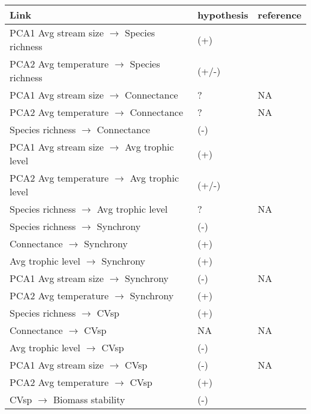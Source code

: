 \begin{tabular}{| m{7cm}| m{2cm}| m{4cm}|}
    \hline
    Link & hypothesis & reference\\
    \hline
    PCA1 Avg stream size $\to$ Species richness & (+) &
    \citet{post_ecosystem_2000, doi_resource_2009, mchugh_dual_2010} \\
    \hline
    PCA2 Avg temperature $\to$ Species richness & (+/-) & \citet{ogorman_unexpected_2017,gauzens_biodiversity_2020} \\
    \hline
    PCA1 Avg stream size $\to$ Connectance & ? & NA\\
    \hline
    PCA2 Avg temperature $\to$ Connectance & ? & NA\\
    \hline
    Species richness $\to$ Connectance & (-) & \citet{dunne_network_2006} \\
    \hline
    PCA1 Avg stream size $\to$ Avg trophic level & (+) & \citet{mchugh_dual_2010}\\
    \hline
    PCA2 Avg temperature $\to$ Avg trophic level & (+/-) & \citet{ogorman_unexpected_2017}\\
    \hline
    Species richness $\to$ Avg trophic level & ? & NA\\
    \hline
    Species richness $\to$ Synchrony & (-) & \citet{thebault_trophic_2005, loreau_species_2008, thibaut_understanding_2013} \\
    \hline
    Connectance $\to$ Synchrony & (+) & \citet{teng_dynamics_2004}\\
    \hline
    Avg trophic level $\to$ Synchrony & (+) & \citet{raimondo_interspecific_2004}\\
    \hline
    PCA1 Avg stream size $\to$ Synchrony & (-) & NA\\
    \hline
    PCA2 Avg temperature $\to$ Synchrony & (+) & \citet{loreau_species_2008}\\
    \hline
    Species richness $\to$ CVsp & (+) & \citep{tilman_biodiversity_1996} \\
    \hline
    Connectance $\to$ CVsp & NA & NA\\
    \hline
    Avg trophic level $\to$ CVsp & (-) & \citet{shanafelt_stability_2018}\\
    \hline
    PCA1 Avg stream size $\to$ CVsp & (-) & NA\\
    \hline
    PCA2 Avg temperature $\to$ CVsp & (+) & \citep{ogorman_unexpected_2017;tabi_warming_2019}\\
    \hline
    CVsp $\to$ Biomass stability & (-) & \citet{thibaut_understanding_2013}\\

\end{tabular}
